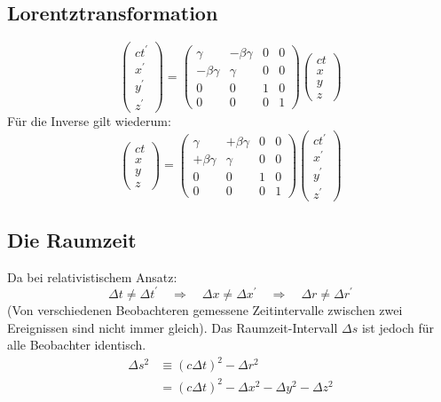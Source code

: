 \subsection{Lorentztransformation}
\begin{equation}
\begin{pmatrix}
ct^\prime \\
x^\prime \\
y^\prime \\
z^\prime
\end{pmatrix}
= 
\begin{pmatrix}
\gamma			& -\beta \gamma	& 0 & 0 \\
-\beta \gamma	& \gamma			& 0 & 0 \\
0		& 			0 			& 1 & 0 \\
0		& 			0 			& 0 & 1
\end{pmatrix}
\begin{pmatrix}
ct \\
x \\
y \\
z
\end{pmatrix}
\end{equation}
Für die Inverse gilt wiederum:
\begin{equation}
\begin{pmatrix}
ct \\
x \\
y \\
z
\end{pmatrix}
= 
\begin{pmatrix}
\gamma			& +\beta \gamma	& 0 & 0 \\
+\beta \gamma	& \gamma			& 0 & 0 \\
0		& 			0 			& 1 & 0 \\
0		& 			0 			& 0 & 1
\end{pmatrix}
\begin{pmatrix}
ct^\prime \\
x^\prime \\
y^\prime \\
z^\prime
\end{pmatrix}
\end{equation}
\subsection{Die Raumzeit}
Da bei relativistischem Ansatz:
\begin{equation}
\Delta t \neq \Delta t^\prime \quad\Rightarrow\quad \Delta x \neq \Delta x^\prime \quad\Rightarrow\quad \Delta r \neq \Delta r^\prime
\end{equation}
(Von verschiedenen Beobachteren gemessene Zeitintervalle zwischen zwei Ereignissen sind nicht immer gleich). Das Raumzeit-Intervall $\Delta s$ ist jedoch für alle Beobachter identisch. 
\begin{equation}
\begin{split}
\Delta s ^2 	& \equiv (c \Delta t)^2 - \Delta r ^2 \\
			& = (c \Delta t)^2 - \Delta x ^2 - \Delta y ^2 - \Delta z ^2
\end{split}
\end{equation}
